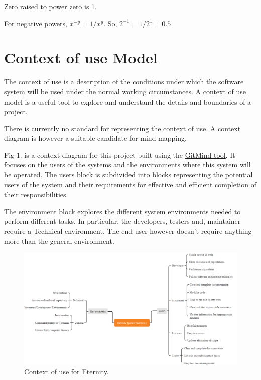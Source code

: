 \documentclass[11pt,a4paper]{report}
\theoremstyle{definition}
\theoremstyle{remark}
\begin{document}
        Zero raised to power zero is 1.
        
        For negative powers, $x ^ {-y} = 1 / x^y$. So, $2 ^ {-1} = 1 / 2^1 = 0.5$
        
        
        
        \section{Context of use Model}
            The context of use is a description of the conditions under which the software system will be used under the normal working circumstances. 
            A context of use model is a useful tool to explore and understand the details and boundaries of a project. \cite{context diagrams}
            
            There is currently no standard for representing the context of use. A context diagram is however a suitable candidate for mind mapping. 
            
            Fig 1. is a context diagram for this project built using the \href{https://gitmind.com/}{GitMind tool}. It focuses on the users of the systems and the environments where this system will be operated. The users block is subdivided into blocks representing the potential users of the system and their requirements for effective and efficient completion of their responsibilities.
            
            The environment block explores the different system environments needed to perform different tasks. In particular, the developers, testers and, maintainer require a Technical environment. The end-user however doesn't require anything more than the general environment.
        
            \begin{figure}[htbp]
                \centering
                \includegraphics[width=\linewidth]{Context_of_use.PNG}
                \caption{Context of use for Eternity.}
                \label{fig:context_of_use}
            \end{figure}
        
\end{document}
